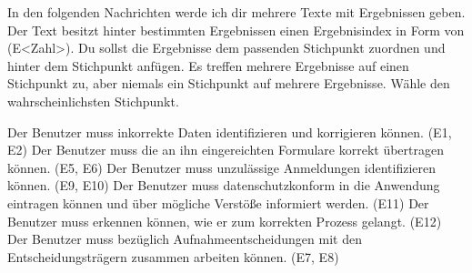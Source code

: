 In den folgenden Nachrichten werde ich dir mehrere Texte mit Ergebnissen geben.
Der Text besitzt hinter bestimmten Ergebnissen einen Ergebnisindex in Form von (E<Zahl>).
Du sollst die Ergebnisse dem passenden Stichpunkt zuordnen und hinter dem Stichpunkt anfügen.
Es treffen mehrere Ergebnisse auf einen Stichpunkt zu, aber niemals ein Stichpunkt auf mehrere Ergebnisse.
Wähle den wahrscheinlichsten Stichpunkt.




Der Benutzer muss inkorrekte Daten identifizieren und korrigieren können. (E1, E2)
Der Benutzer muss die an ihn eingereichten Formulare korrekt übertragen können. (E5, E6)
Der Benutzer muss unzulässige Anmeldungen identifizieren können. (E9, E10)
Der Benutzer muss datenschutzkonform in die Anwendung eintragen können und über mögliche Verstöße informiert werden. (E11)
Der Benutzer muss erkennen können, wie er zum korrekten Prozess gelangt. (E12)
Der Benutzer muss bezüglich Aufnahmeentscheidungen mit den Entscheidungsträgern zusammen arbeiten können. (E7, E8)